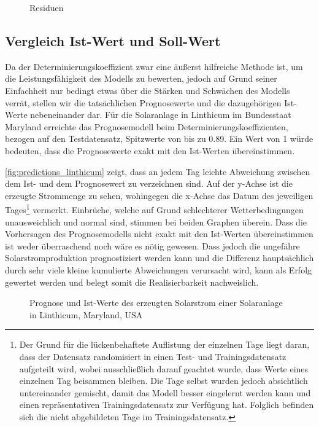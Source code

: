 \documentclass[12pt, a4paper]{article}
\begin{document}

\begin{figure}
\centering
\def\svgwidth{400pt}

\caption{Residuen }
\label{fig:residuals}
\end {figure}

\subsection{Vergleich Ist-Wert und Soll-Wert}

Da der Determinierungskoeffizient zwar eine äußerst hilfreiche Methode ist, um die Leistungsfähigkeit des Modells zu bewerten, jedoch auf Grund seiner Einfachheit nur bedingt etwas über die Stärken und Schwächen des Modells verrät, stellen wir die tatsächlichen Prognosewerte und die dazugehörigen Ist-Werte nebeneinander dar. Für die Solaranlage in Linthicum im Bundesstaat Maryland erreichte das Prognosemodell beim Determinierungskoeffizienten, bezogen auf den Testdatensatz, Spitzwerte von bis zu 0.89. Ein Wert von 1 würde bedeuten, dass die Prognosewerte exakt mit den Ist-Werten übereinstimmen. 

\autoref{fig:predictions_linthicum} zeigt, dass an jedem Tag leichte Abweichung zwischen dem Ist- und dem Prognosewert zu verzeichnen sind. Auf der y-Achse ist die erzeugte Strommenge zu sehen, wohingegen die x-Achse das Datum des jeweiligen Tages\footnote{Der Grund für die lückenbehaftete Auflistung der einzelnen Tage liegt daran, dass der Datensatz randomisiert in einen Test- und Trainingsdatensatz aufgeteilt wird, wobei ausschließlich darauf geachtet wurde, dass Werte eines einzelnen Tag beisammen bleiben. Die Tage selbst wurden jedoch absichtlich untereinander gemischt, damit das Modell besser eingelernt werden kann und einen repräsentativen Trainingsdatensatz zur Verfügung hat. Folglich befinden sich die nicht abgebildeten Tage im Trainingsdatensatz.} vermerkt. Einbrüche, welche auf Grund schlechterer Wetterbedingungen unausweichlich und normal sind, stimmen bei beiden Graphen überein. Dass die Vorhersagen des Prognosemodells nicht exakt mit den Ist-Werten übereinstimmen ist weder überraschend noch wäre es nötig gewesen. Dass jedoch die ungefähre Solarstromproduktion prognostiziert werden kann und die Differenz hauptsächlich durch sehr viele kleine kumulierte Abweichungen verursacht wird, kann als Erfolg gewertet werden und belegt somit die Realisierbarkeit nachweislich.


\begin{figure}[H]
\centering
\def\svgwidth{400pt}

\caption{Prognose und Ist-Werte des erzeugten Solarstrom einer Solaranlage in Linthicum, Maryland, USA}
\label{fig:predictions_linthicum}
\end {figure}
\end{document}
